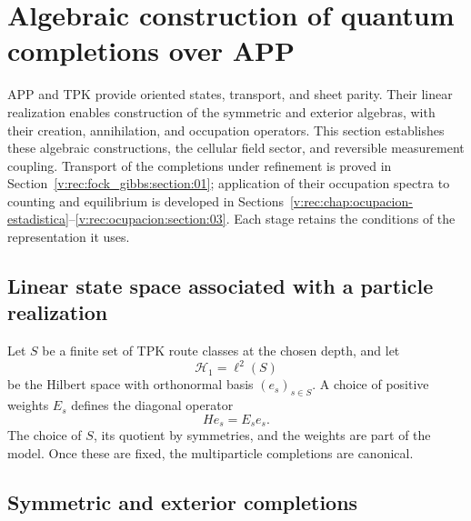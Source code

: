 \section{Algebraic construction of quantum completions over APP}
\label{v:rec:chap:completaciones-cuanticas}
\label{v:sec:completaciones-algebraicas}

APP and TPK provide oriented states, transport, and sheet parity.
Their linear realization enables construction of the symmetric and exterior algebras,
with their creation, annihilation, and occupation operators. This section
establishes these algebraic constructions, the cellular field sector, and
reversible measurement coupling. Transport of the completions
under refinement is proved in
Section~\ref{v:rec:fock_gibbs:section:01}; application of their occupation
spectra to counting and equilibrium is developed in
Sections~\ref{v:rec:chap:ocupacion-estadistica}--\ref{v:rec:ocupacion:section:03}.
Each stage retains the conditions of the representation it uses.

\subsection{Linear state space associated with a particle realization}
\label{v:rec:completaciones:section:02}

Let \(S\) be a finite set of TPK route classes at the chosen depth,
and let
\[
 \mathcal H_1=\ell^2(S)
\]
be the Hilbert space with orthonormal basis \((e_s)_{s\in S}\). A choice of
positive weights \(E_s\) defines the diagonal operator
\[
 He_s=E_se_s.
\]
The choice of \(S\), its quotient by symmetries, and the weights are part
of the model. Once these are fixed, the multiparticle completions are canonical.

\subsection{Symmetric and exterior completions}
\label{v:rec:completaciones:section:03}

